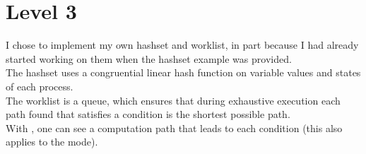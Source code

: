 \section{Level 3}

I chose to implement my own hashset and worklist, in part because I had
already started working on them when the hashset example was provided.\\
The hashset uses a congruential linear hash function on variable values and
states of each process.\\

The worklist is a queue, which ensures that during exhaustive execution each
path found that satisfies a condition is the shortest possible path.\\

With , one can see a computation path that leads to each condition
(this also applies to the  mode).

